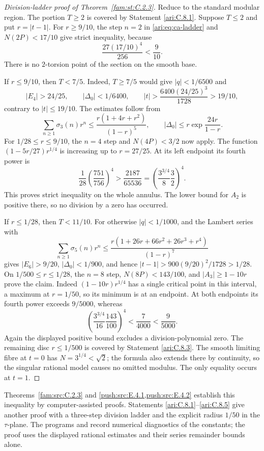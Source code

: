 \begin{proof}[Division-ladder proof of Theorem~\ref{fam:st:C.2.3}]
Reduce to the standard modular region. The portion $T\ge2$
is covered by Statement \ref{ari:C.8.1}. Suppose $T\le2$ and put
$r=|t-1|$. For $r\ge9/10$, the step $n=2$ in
\eqref{ari:eq:ca-ladder} and $N(2P)<17/10$ give strict inequality,
because
\[
 \frac{27(17/10)^4}{256}<\frac9{10}.
\]
There is no $2$-torsion point of the section on the smooth base.

If $r\le9/10$, then $T<7/5$. Indeed, $T\ge7/5$ would give
$|q|<1/6500$ and
\[
 |E_4|>24/25,\qquad |\Delta_0|<1/6400,
 \qquad |t|>\frac{6400(24/25)^3}{1728}>19/10,
\]
contrary to $|t|\le19/10$. The estimates follow from
\[
 \sum_{n\ge1}\sigma_3(n)r^n
 \le\frac{r(1+4r+r^2)}{(1-r)^5},\qquad
 |\Delta_0|\le r\exp\frac{24r}{1-r}.
\]
For $1/28\le r\le9/10$, the $n=4$ step and
$N(4P)<3/2$ now apply. The function
$(1-5r/27)r^{1/4}$ is increasing up to $r=27/25$.
At its left endpoint its fourth power is
\[
 \frac1{28}\left(\frac{751}{756}\right)^4
 >\frac{2187}{65536}
 =\left(\frac{3^{3/4}}8\frac32\right)^4.
\]
This proves strict inequality on the whole annulus. The lower
bound for $A_2$ is positive there, so no division by a zero has
occurred.

If $r\le1/28$, then $T<11/10$. For otherwise $|q|<1/1000$,
and the Lambert series with
\[
 \sum_{n\ge1}\sigma_5(n)r^n
 \le\frac{r(1+26r+66r^2+26r^3+r^4)}{(1-r)^7}
\]
gives $|E_6|>9/20$, $|\Delta_0|<1/900$, and hence
$|t-1|>900(9/20)^2/1728>1/28$.
On $1/500\le r\le1/28$, the $n=8$ step,
$N(8P)<143/100$, and $|A_3|\ge1-10r$ prove the claim.
Indeed $(1-10r)r^{1/4}$ has a single critical point in this
interval, a maximum at $r=1/50$, so its minimum is at an endpoint.
At both endpoints its fourth power exceeds $9/5000$, whereas
\[
 \left(\frac{3^{3/4}}{16}\frac{143}{100}\right)^4
 <\frac7{4000}<\frac9{5000}.
\]
Again the displayed positive bound excludes a division-polynomial
zero. The remaining disc $r\le1/500$ is covered by Statement
\ref{ari:C.8.3}. The smooth limiting fibre at $t=0$ has
$N=3^{1/4}<\sqrt2$; the formula also extends there by
continuity, so the singular rational model causes no omitted
modulus. The only equality occurs at $t=1$.
\end{proof}

Theorems~\ref{fam:src:C.2.3} and \cref{push:src:E.4.1,push:src:E.4.2} establish this inequality by
computer-assisted proofs. Statements \ref{ari:C.8.1}--\ref{ari:C.8.5} give another
proof with a three-step division ladder and the explicit radius
$1/50$ in the $\tau$-plane. The programs
 and
 record numerical diagnostics
of the constants; the proof uses the displayed rational estimates
and their series remainder bounds alone.



